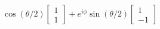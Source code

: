 \documentclass[preview]{standalone}
\begin{document}
\begin{align*}
\cos( \theta /2) \begin{bmatrix} 1 \\ 1\end{bmatrix} + e^{i \phi }\sin( \theta /2) \begin{bmatrix} 1 \\ -1\end{bmatrix}
\end{align*}
\end{document}

